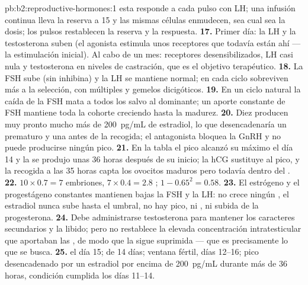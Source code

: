 \begin{solution}{pb:b2:reproductive-hormones:1}
esta responde a cada pulso con LH; una infusión continua lleva la reserva
a 15 y las mismas células enmudecen, sea cual sea la dosis; los pulsos
restablecen la reserva y la respuesta.
\textbf{17.} Primer día: la LH y la testosterona suben (el agonista
estimula unos receptores que todavía están ahí --- la estimulación
inicial). Al cabo de un mes: receptores desensibilizados, LH casi nula y
testosterona en niveles de castración, que es el objetivo terapéutico.
\textbf{18.} La FSH sube (sin inhibina) y la LH se mantiene normal; en cada
ciclo sobreviven más  a la selección, con  múltiples y
gemelos dicigóticos.
\textbf{19.} En un ciclo natural la caída de la FSH mata a todos los
 salvo al dominante; un aporte constante de FSH mantiene toda la
cohorte creciendo hasta la madurez.
\textbf{20.} Diez  producen muy pronto mucho más de
\qty{200}{pg/mL} de estradiol, lo que desencadenaría un 
prematuro y una  antes de la recogida; el antagonista bloquea la
GnRH y no puede producirse ningún pico.
\textbf{21.} En la tabla el pico alcanzó su máximo el día 14 y la
 se produjo unas 36 horas después de su inicio; la hCG sustituye
al pico, y la recogida a las 35 horas capta los ovocitos maduros pero
todavía dentro del .
\textbf{22.} $10\times 0.7 = 7$ embriones, $7\times 0.4 = 2.8$
; $1 - 0.65^{2} = 0.58$.
\textbf{23.} El estrógeno y el progestágeno constantes mantienen bajas la
FSH y la LH: no crece ningún , el estradiol nunca sube hasta el
umbral, no hay pico, ni , ni subida de la progesterona.
\textbf{24.} Debe administrarse testosterona para mantener los caracteres
secundarios y la libido; pero no restablece la elevada concentración
intratesticular que aportaban las , de modo que la
 sigue suprimida --- que es precisamente lo que se busca.
\textbf{25.}  el día 15;  de 14 días; ventana fértil,
días 12--16; pico desencadenado por un estradiol por encima de
\qty{200}{pg/mL} durante más de 36 horas, condición cumplida los días
11--14.
\end{solution}
